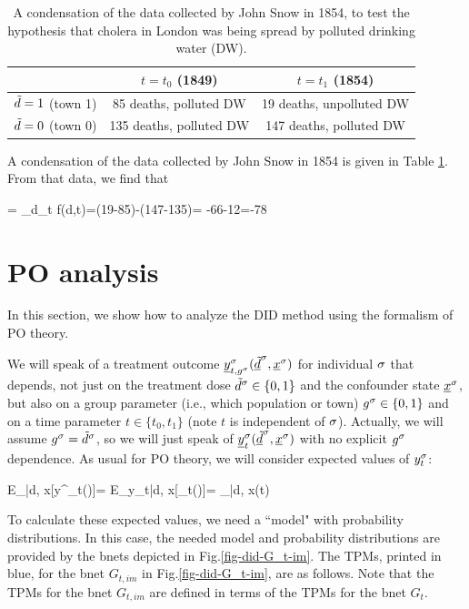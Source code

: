 \begin{table}[h!]
\centering
{\renewcommand{\arraystretch}{1.4}
\begin{tabular}{|c|c|c|}
\hline 
\rowcolor[HTML]{ECF4FF} 
 & $t=t_0 $ (1849) & $t=t_1$ (1854) \\ 
\hline
${\tilde{d}}=1 $ (town 1)\cellcolor[HTML]{ECF4FF}
&85 deaths, polluted DW&19 deaths, unpolluted DW\\
\hline 
${\tilde{d}}=0 $ (town 0)\cellcolor[HTML]{ECF4FF} 
&135 deaths, polluted DW& 147 deaths, polluted DW\\ 
\end{tabular}
}
\caption{A condensation of the data
collected by 
John Snow in 1854,
to test the hypothesis
that cholera in London was being spread by
polluted drinking water (DW).}
\label{tab-john-snow}
\end{table}

A condensation of the
data collected by John Snow in 1854
is given in Table \ref{tab-john-snow}.
From that data, we find that

\beq
\delta= \Delta_d\Delta_t f(d,t)=(19-85)-(147-135)=
-66-12=-78
\eeq



\section{PO analysis}
In this section,
we show how
to analyze the
DID method
using the formalism of PO theory.

We will speak of a treatment 
outcome
${\underline{y}}^\sigma_{t, g^\sigma}
({\underline{\tilde{d}}}^\sigma, {\underline{x}}^\sigma)$
for individual $\sigma$
that depends, not 
just on the treatment dose 
${\tilde{d}}^\sigma\in \{0,1\}$
and the confounder state ${\underline{x}}^\sigma$,
but also
on a group parameter (i.e., which population
or town)
$g^\sigma\in \{0,1\}$
and on a time parameter $t\in\{t_0, t_1\}$ 
(note $t$ is independent of $\sigma$).
Actually,
we will assume $g^\sigma={\tilde{d}}^\sigma$,
so we will just speak of
${\underline{y}}^\sigma_t({\underline{\tilde{d}}}^\sigma, {\underline{x}}^\sigma)$
with no explicit $g^\sigma$
dependence. As usual for PO theory,
we will consider
expected values of $y^\sigma_t$:


\beq
E_{\s|d, x}[y^\s_t(\td)]=
 E_{y_t|d, x}[\rvy_t(\td)]=
\caly_{\td|d, x}(t)
\eeq

To calculate these
expected values, we need a ``model"
with probability 
distributions.
In this case,
the needed model and probability
distributions are
provided by the
bnets depicted in Fig.\ref{fig-did-G_t-im}.
The TPMs,
printed in blue,
for the 
 bnet
$G_{t, im}$
in Fig.\ref{fig-did-G_t-im},
are as follows.
Note
that the
TPMs for the bnet $G_{t, im}$
are defined in 
terms
of the TPMs for the bnet $G_t$.


